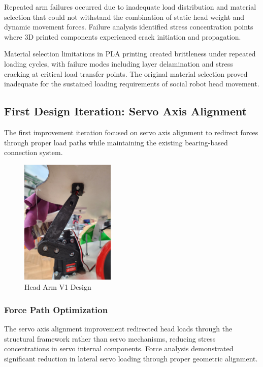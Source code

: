 Repeated arm failures occurred due to inadequate load distribution and material selection that could not withstand the combination of static head weight and dynamic movement forces. Failure analysis identified stress concentration points where 3D printed components experienced crack initiation and propagation.

Material selection limitations in PLA printing created brittleness under repeated loading cycles, with failure modes including layer delamination and stress cracking at critical load transfer points. The original material selection proved inadequate for the sustained loading requirements of social robot head movement.

\subsection{First Design Iteration: Servo Axis Alignment}

The first improvement iteration focused on servo axis alignment to redirect forces through proper load paths while maintaining the existing bearing-based connection system.

\begin{figure}[H]
    \centering
    \includegraphics[height=6cm, angle=-90]{Images/HeadArmV2.jpg}
    \caption{Head Arm V1 Design}
    \label{fig:head_arm_v1}
\end{figure}

\subsubsection{Force Path Optimization}

The servo axis alignment improvement redirected head loads through the structural framework rather than servo mechanisms, reducing stress concentrations in servo internal components. Force analysis demonstrated significant reduction in lateral servo loading through proper geometric alignment.

